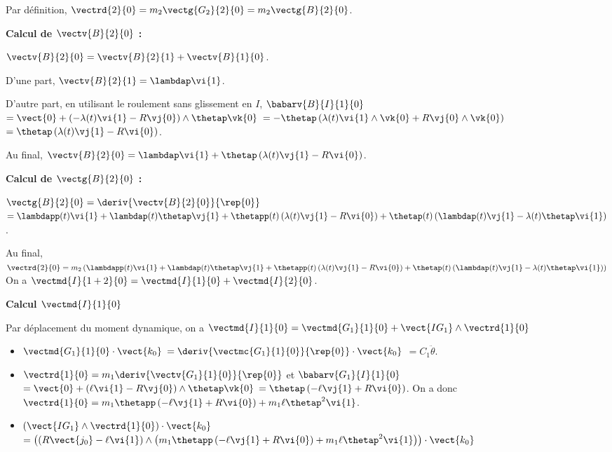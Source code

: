 \begin{corrigebox}
Par définition, $\vectrd{2}{0} =  m_2 \vectg{G_2}{2}{0}=  m_2 \vectg{B}{2}{0}$.

\vspace{.5cm}

\textbf{Calcul de $ \vectv{B}{2}{0}$ :}

$\vectv{B}{2}{0}=\vectv{B}{2}{1}+\vectv{B}{1}{0}$.

D'une part,  $\vectv{B}{2}{1}=\lambdap\vi{1}$.

D'autre part, en utilisant le roulement sans glissement en $I$, 
$\babarv{B}{I}{1}{0} $ $=\vect{0}+\left(-\lambda(t)\vi{1}-R\vj{0} \right)\wedge\thetap \vk{0}$
$=-\thetap\left(\lambda(t)\vi{1}\wedge \vk{0}+R\vj{0}\wedge \vk{0} \right)$
$=\thetap\left(\lambda(t)\vj{1}-R\vi{0} \right)$.

Au final, $\vectv{B}{2}{0} = \lambdap\vi{1} + \thetap\left(\lambda(t)\vj{1}-R\vi{0} \right)$.

\vspace{.5cm}

\textbf{Calcul de $ \vectg{B}{2}{0}$ :}

$\vectg{B}{2}{0} = \deriv{\vectv{B}{2}{0}}{\rep{0}}$
$ = \lambdapp(t)\vi{1} +\lambdap(t)\thetap\vj{1} 
+ \thetapp(t)\left(\lambda(t)\vj{1}-R\vi{0} \right)
+ \thetap(t)\left(\lambdap(t)\vj{1}-\lambda(t)\thetap\vi{1} \right)
$.

Au final, $\vectrd{2}{0} =  m_2 \left( \lambdapp(t)\vi{1} +\lambdap(t)\thetap\vj{1} 
+ \thetapp(t)\left(\lambda(t)\vj{1}-R\vi{0} \right)
+ \thetap(t)\left(\lambdap(t)\vj{1}-\lambda(t)\thetap\vi{1} \right)\right)$
On a $\vectmd{I}{1+2}{0} = \vectmd{I}{1}{0} + \vectmd{I}{2}{0}$.

\textbf{Calcul $\vectmd{I}{1}{0}$}

Par déplacement du moment dynamique, on a 
$\vectmd{I}{1}{0} = \vectmd{G_1}{1}{0} + \vect{IG_1}\wedge \vectrd{1}{0}$
\begin{itemize}
\item $\vectmd{G_1}{1}{0}\cdot \vect{k_0} $ $= \deriv{\vectmc{G_1}{1}{0}}{\rep{0}} \cdot \vect{k_0} $ $=C_1 \ddot{\theta}$.
\item $\vectrd{1}{0} = m_1\deriv{\vectv{G_1}{1}{0}}{\rep{0}}$ et  
$\babarv{G_1}{I}{1}{0} $ $=\vect{0}+\left(\ell\vi{1}-R\vj{0} \right)\wedge\thetap \vk{0}$
$=\thetap\left(-\ell\vj{1}+R\vi{0} \right)$. 
On a donc $\vectrd{1}{0} = m_1\thetapp\left(-\ell\vj{1}+R\vi{0} \right)+m_1\ell\thetap^2\vi{1}$.
\item $ \left(\vect{IG_1}\wedge \vectrd{1}{0}\right)  \cdot \vect{k_0}$ 
$ = \left(\left(R\vect{j_0}-\ell\vi{1}\right)\wedge\left( m_1\thetapp\left(-\ell\vj{1}+R\vi{0} \right)+m_1\ell\thetap^2\vi{1}\right)\right)\cdot \vect{k_0}$


\end{itemize}
\end{corrigebox}
